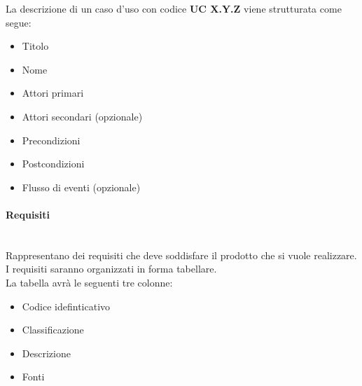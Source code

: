 La descrizione di un caso d’uso con codice \textbf{UC X.Y.Z} viene strutturata come segue:
\begin{itemize}
	\item Titolo
	\item Nome
	\item Attori primari
	\item Attori secondari (opzionale)
	\item Precondizioni
	\item Postcondizioni
	\item Flusso di eventi (opzionale)	
\end{itemize}
\paragraph{Requisiti}\mbox{}\\
Rappresentano dei requisiti che deve soddisfare il prodotto che si vuole realizzare.\\
I requisiti saranno organizzati in forma tabellare.\\
La tabella avrà le seguenti tre colonne:
\begin{itemize}
	\item Codice idefinticativo
	\item Classificazione
	\item Descrizione
	\item Fonti
\end{itemize}
